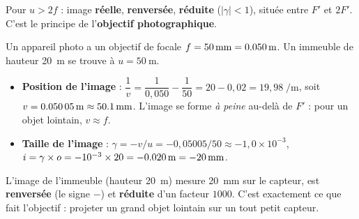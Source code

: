 \documentclass[11pt,a4paper]{article}
\newcommand{\LentilleConv}[2]{%
  \draw[verrecol,line width=1.8pt,<->,>=Stealth] (#1,-#2)--(#1,#2);}
\newcommand{\gamm}{\gamma}             %
\begin{document}
\begin{center}
\end{center}

\begin{theoreme}
Pour $u>2f$ : image \textbf{réelle}, \textbf{renversée}, \textbf{réduite} ($|\gamm|<1$), située
entre $F'$ et $2F'$. C'est le principe de l'\textbf{objectif photographique}.
\end{theoreme}

\begin{exemple}
Un appareil photo a un objectif de focale $f=\SI{50}{\milli\metre}=\SI{0{,}050}{\metre}$. Un immeuble
de hauteur \SI{20}{\metre} se trouve à $u=\SI{50}{\metre}$.
\begin{itemize}[leftmargin=1.7em,topsep=2pt,itemsep=1pt]
  \item \textbf{Position de l'image} :
        $\dfrac{1}{v}=\dfrac{1}{0{,}050}-\dfrac{1}{50}=20-0{,}02=19{,}98\;\si{\per\metre}$,
        soit $v=\SI{0{,}05005}{\metre}\approx\SI{50{,}1}{\milli\metre}$. L'image se forme \emph{à
        peine} au-delà de $F'$ : pour un objet lointain, $v\approx f$.
  \item \textbf{Taille de l'image} :
        $\gamm=-v/u=-0{,}05005/50\approx -1{,}0\times 10^{-3}$,
        $i=\gamm\times o=-10^{-3}\times 20=\SI{-0{,}020}{\metre}=\SI{-20}{\milli\metre}$.
\end{itemize}
L'image de l'immeuble (hauteur \SI{20}{\metre}) mesure \SI{20}{\milli\metre} sur le capteur, est
\textbf{renversée} (le signe $-$) et \textbf{réduite} d'un facteur $1000$. C'est exactement ce que
fait l'objectif : projeter un grand objet lointain sur un tout petit capteur.
\end{exemple}
\end{document}
